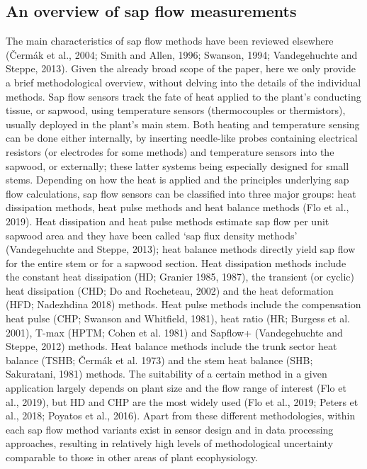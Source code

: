 \documentclass[11pt,twoside]{reedthesis}
\begin{document}
\subsection{An overview of sap flow
measurements}\label{an-overview-of-sap-flow-measurements}

The main characteristics of sap flow methods have been reviewed
elsewhere (Čermák et al., 2004; Smith and Allen, 1996; Swanson, 1994;
Vandegehuchte and Steppe, 2013). Given the already broad scope of the
paper, here we only provide a brief methodological overview, without
delving into the details of the individual methods. Sap flow sensors
track the fate of heat applied to the plant's conducting tissue, or
sapwood, using temperature sensors (thermocouples or thermistors),
usually deployed in the plant's main stem. Both heating and temperature
sensing can be done either internally, by inserting needle-like probes
containing electrical resistors (or electrodes for some methods) and
temperature sensors into the sapwood, or externally; these latter
systems being especially designed for small stems. Depending on how the
heat is applied and the principles underlying sap flow calculations, sap
flow sensors can be classified into three major groups: heat dissipation
methods, heat pulse methods and heat balance methods (Flo et al., 2019).
Heat dissipation and heat pulse methods estimate sap flow per unit
sapwood area and they have been called `sap flux density methods'
(Vandegehuchte and Steppe, 2013); heat balance methods directly yield
sap flow for the entire stem or for a sapwood section. Heat dissipation
methods include the constant heat dissipation (HD; Granier 1985, 1987),
the transient (or cyclic) heat dissipation (CHD; Do and Rocheteau, 2002)
and the heat deformation (HFD; Nadezhdina 2018) methods. Heat pulse
methods include the compensation heat pulse (CHP; Swanson and Whitfield,
1981), heat ratio (HR; Burgess et al. 2001), T-max (HPTM; Cohen et al.
1981) and Sapflow+ (Vandegehuchte and Steppe, 2012) methods. Heat
balance methods include the trunk sector heat balance (TSHB; Čermák et
al. 1973) and the stem heat balance (SHB; Sakuratani, 1981) methods. The
suitability of a certain method in a given application largely depends
on plant size and the flow range of interest (Flo et al., 2019), but HD
and CHP are the most widely used (Flo et al., 2019; Peters et al., 2018;
Poyatos et al., 2016). Apart from these different methodologies, within
each sap flow method variants exist in sensor design and in data
processing approaches, resulting in relatively high levels of
methodological uncertainty comparable to those in other areas of plant
ecophysiology.\par
\end{document}

